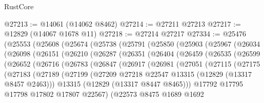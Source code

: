 \begin{lexlean}{RustCore}
\begin{coremodule}
@27213 := @14061 (@14062 @8462)
@27214 := @27211 @27213
@27217 := @12829 (@14067 @1678 @11)
@27218 := @27214 @27217
@27334 := @25476
    (@25553
      (@25608
        (@25674
          (@25738
            (@25791
              (@25850
                (@25903
                  (@25967
                    (@26034
                      (@26098
                        (@26151
                          (@26210
                            (@26287
                              (@26351
                                (@26404
                                  (@26459
                                    (@26535
                                      (@26599
                                        (@26652
                                          (@26716
                                            (@26783
                                              (@26847
                                                (@26917
                                                  (@26981
                                                    (@27051
                                                      (@27115
                                                        (@27175
                                                          (@27183
                                                            (@27189
                                                              (@27199
                                                                (@27209
                                                                  @27218
                                                                  @22547
                                                                  @13315
                                                                  (@12829 (@13317 @8457 @2463)))
                                                                @13315
                                                                (@12829 (@13317 @8447 @8465)))
                                                              @17792
                                                              @17795
                                                              @17798
                                                              @17802
                                                              @17807
                                                              @22567)
                                                            (@22573
                                                              @8475
                                                              @1689
                                                              @1692

\end{coremodule}
\end{lexlean}

